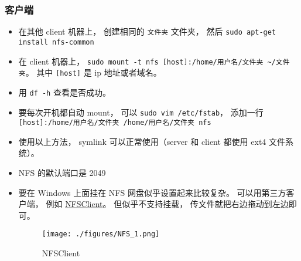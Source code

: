 \subsubsection{客户端}
\begin{itemize}
\item 在其他 client 机器上， 创建相同的 \verb|文件夹| 文件夹， 然后 \verb|sudo apt-get install nfs-common|
\item 在 client 机器上， \verb|sudo mount -t nfs [host]:/home/用户名/文件夹 ~/文件夹|。 其中 \verb|[host]| 是 ip 地址或者域名。
\item 用 \verb|df -h| 查看是否成功。
\item 要每次开机都自动 mount， 可以 \verb|sudo vim /etc/fstab|， 添加一行 \verb|[host]:/home/用户名/文件夹 /home/用户名/文件夹 nfs|
\item 使用以上方法， symlink 可以正常使用（server 和 client 都使用 ext4 文件系统）。
\item NFS 的默认端口是 2049
\item 要在 Windows 上面挂在 NFS 网盘似乎设置起来比较复杂。 可以用第三方客户端， 例如 \href{https://sourceforge.net/projects/nfsclient/}{NFSClient}。 但似乎不支持挂载， 传文件就把右边拖动到左边即可。
\begin{figure}[ht]
\centering
\texttt{[image: ./figures/NFS\_1.png]}
\caption{NFSClient} \label{NFS_fig1}
\end{figure}
\end{itemize}
